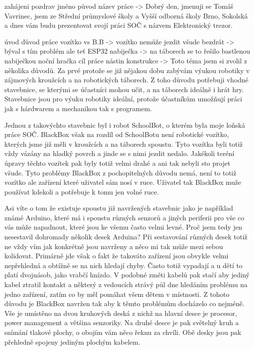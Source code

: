 zahájeni
{
    pozdrav
    jméno
    původ
    název práce
}-> Dobrý den, jmenuji se Tomáš Vavrinec, jsem ze Střední průmyslové školy a Vyšší odborná školy Brno, Sokolská
    a dnes vám budu prezentovat 
    svojí práci SOČ s názvem Elektronický trezor. %

úvod
{
    důvod práce
        vozítko vs B.B  -> vozítko nemůže jezdit všude
        bezdrát         -> býval s tím problém ale teť ESP32
        nabiječka       -> na táborech se to řešilo bastlenou nabiječkou
        noční hračka
    cíl práce
    nástin konstrukce
}-> Toto téma jsem si zvolil z několika důvodů. Za prvé protože se již nějakou dobu zabývám 
    výukou robotiky v zájmových kroužcích a na robotických táborech. Z toho důvodu potřebuji 
    vhodné stavebnice, se kterými se účastníci mohou učit, a na táborech ideálně i hrát hry.
    Stavebnice jsou pro výuku robotiky ideální, protože účastníkům umožňují práci jak 
    s hárdwarem a mechanikou tak s programem.

    Jednou z takovýchto stavebnic byl i robot SchoolBot, o kterém byla moje loňská práce SOČ.
    BlackBox však na rozdíl od SchoolBotu není robotické vozítko, kterých jsme již měli v kroužcích
    a na táborech spoustu. 
    Tyto vozítka byli totiž vždy vázány na hladký povrch a jinde se s nimi jezdit nedalo.
    Jakékoli teréní úpravy těchto vozítek pak byly totiž velmi drahé a ani tak nebyli sto projet všude.
    Tyto problémy BlackBox z pochopitelných důvodu nemá, není to totiž vozítko ale zařízení které uživatel
    sám nosí v ruce. Uživatel tak BlackBox muže používat kdekoli a potřebuje k tomu jen volné ruce.
    
    Asi víte o tom že existuje spoustu již navržených stavebnic jako je například známé Arduino, 
    které má i spoustu různých senzorů a jiných periferii pro vše co vás může napadnout, které jsou ke všemu 
    často velmi levné. 
    Proč jsem tedy jen nesestavil dohromady několik desek Arduina? Při sestavování různých desek
    totiž ne vždy vím jak konkrétně jsou navrženy a něco mi tak může mezi sebou kolidovat.
    Primárně jde však o fakt že takováto zařízení jsou obvykle velmi nepřehledná a obtížně 
    se na nich hledají chyby. Často totiž vypadají a u dětí to platí dvojnásob, jako vrabčí hnízdo.
    V podobné změti kabelů pak stačí aby jediný kabel ztratil kontakt a některý z vedoucích 
    strávý půl dne hledáním problému na jedno zařízení, zatím co by měl pomáhat všem dětem v místnosti.
    Z tohoto důvodu je BlackBox navržen tak aby k těmto problémům docházelo co nejméně. 
    Vše je umístěno na dvou kruhových deská z nichž na hlavní desce je procesor, power management a většina
    senzoriky. Na druhé desce je pak světelný kruh a snímání tlakové plochy, o obojím vám něco řeknu za chvíli.
    Obě desky jsou pak přehledně spojeny jediným plochým kabelem.

